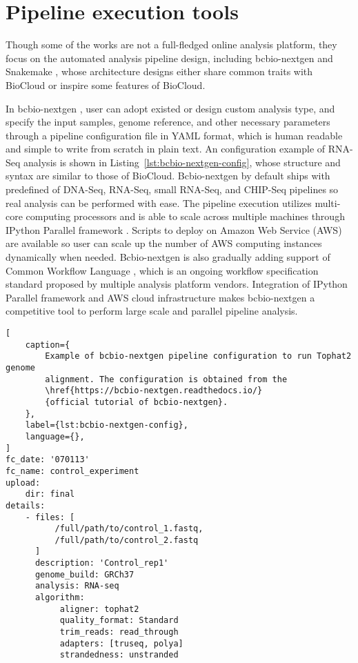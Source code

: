 \section{Pipeline execution tools}
\label{s:pipeline-execution-tool}

Though some of the works are not a full-fledged online analysis platform, they
focus on the automated analysis pipeline design, including bcbio-nextgen
\cite{:bcbionextgen,guimera2012:bcbionextgen} and Snakemake
\cite{koster2012:snakemakea}, whose architecture designs either share common
traits with BioCloud or inspire some features of BioCloud.

In bcbio-nextgen \cite{:bcbionextgen,guimera2012:bcbionextgen}, user can adopt
existed or design custom analysis type, and specify the input samples, genome
reference, and other necessary parameters through a pipeline configuration file
in YAML format, which is human readable and simple to write from scratch in
plain text. An configuration example of RNA-Seq analysis is shown in
Listing~\ref{lst:bcbio-nextgen-config}, whose structure and syntax are similar
to those of BioCloud. Bcbio-nextgen by default ships with predefined of
DNA-Seq, RNA-Seq, small RNA-Seq, and CHIP-Seq pipelines so real analysis can be
performed with ease. The pipeline execution utilizes multi-core computing
processors and is able to scale across multiple machines through IPython
Parallel framework \cite{:ipython-parallel}. Scripts to deploy on Amazon Web
Service (AWS) are available so user can scale up the number of AWS computing
instances dynamically when needed. Bcbio-nextgen is also gradually adding
support of Common Workflow Language \cite{amstutz2016:common}, which is an
ongoing workflow specification standard proposed by multiple analysis platform
vendors. Integration of IPython Parallel framework and AWS cloud infrastructure
makes bcbio-nextgen a competitive tool to perform large scale and parallel
pipeline analysis.

\begin{lstlisting}[
    caption={
        Example of bcbio-nextgen pipeline configuration to run Tophat2 genome
        alignment. The configuration is obtained from the
        \href{https://bcbio-nextgen.readthedocs.io/}
        {official tutorial of bcbio-nextgen}.
    },
    label={lst:bcbio-nextgen-config},
    language={},
]
fc_date: '070113'
fc_name: control_experiment
upload:
    dir: final
details:
    - files: [
          /full/path/to/control_1.fastq,
          /full/path/to/control_2.fastq
      ]
      description: 'Control_rep1'
      genome_build: GRCh37
      analysis: RNA-seq
      algorithm:
           aligner: tophat2
           quality_format: Standard
           trim_reads: read_through
           adapters: [truseq, polya]
           strandedness: unstranded
\end{lstlisting}

